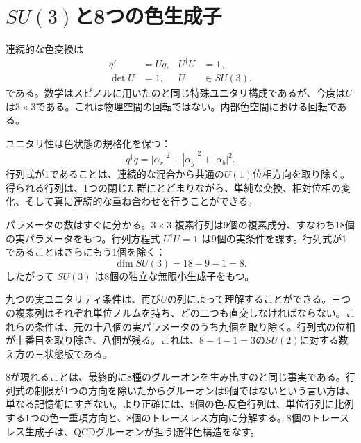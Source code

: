 \begin{classroomqa}
\end{classroomqa}

\section{\texorpdfstring{\(SU(3)\)}{SU(3)}と8つの色生成子}

連続的な色変換は
\begin{equation}
\begin{aligned}
q'&=Uq,
&
U^\dagger U&=\boldsymbol 1,
\\
\det U&=1,
&
U&\in SU(3).
\end{aligned}
\label{eq:l3-su3-action}
\end{equation}
である。数学はスピノルに用いたのと同じ特殊ユニタリ構成であるが、今度は\(U\)は\(3\times3\)である。これは物理空間の回転ではない。内部色空間における回転である。

ユニタリ性は色状態の規格化を保つ：
\begin{equation}
q^\dagger q
=|\alpha_r|^2+|\alpha_g|^2+|\alpha_b|^2.
\end{equation}
行列式が1であることは、連続的な混合から共通の\(U(1)\)位相方向を取り除く。得られる行列は、1つの閉じた群にとどまりながら、単純な交換、相対位相の変化、そして真に連続的な重ね合わせを行うことができる。

パラメータの数はすぐに分かる。\(3\times3\) 複素行列は9個の複素成分、すなわち18個の実パラメータをもつ。行列方程式 \(U^\dagger U=\boldsymbol 1\) は9個の実条件を課す。行列式が1であることはさらにもう1個を除く：
\begin{equation}
\dim SU(3)=18-9-1=8.
\end{equation}
したがって \(SU(3)\) は8個の独立な無限小生成子をもつ。

九つの実ユニタリティ条件は、再び\(U\)の列によって理解することができる。三つの複素列はそれぞれ単位ノルムを持ち、どの二つも直交しなければならない。これらの条件は、元の十八個の実パラメータのうち九個を取り除く。行列式の位相が十番目を取り除き、八個が残る。これは、\(8-4-1=3\)の\(SU(2)\)に対する数え方の三状態版である。

8が現れることは、最終的に8種のグルーオンを生み出すのと同じ事実である。行列式の制限が1つの方向を除いたからグルーオンは9個ではないという言い方は、単なる記憶術にすぎない。より正確には、9個の色-反色行列は、単位行列に比例する1つの色一重項方向と、8個のトレースレス方向に分解する。8個のトレースレス生成子は、QCDグルーオンが担う随伴色構造をなす。

